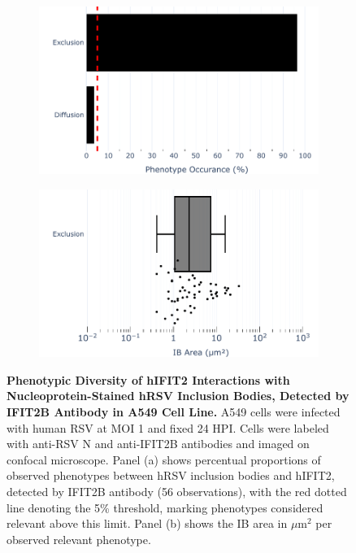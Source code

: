 \begin{figure}
    \begin{subfigure}{0.495\textwidth}
        \caption{}
        \includegraphics[width=1\linewidth]{08. Chapter 3/Figs/02. Infection/02. IFIT2/02. IFIT2B/01. bar_i2b_a549-n.pdf}
    \end{subfigure}
    \begin{subfigure}{0.495\textwidth}
        \caption{}
        \includegraphics[width=1\linewidth]{08. Chapter 3/Figs/02. Infection/02. IFIT2/02. IFIT2B/02. box_i2b_a549-n.pdf}
    \end{subfigure}
    \caption[Phenotypic Diversity of hIFIT2 Interactions with Nucleoprotein-Stained hRSV Inclusion Bodies, Detected by IFIT2B Antibody in A549 Cell Line.]{\textbf{Phenotypic Diversity of hIFIT2 Interactions with Nucleoprotein-Stained hRSV Inclusion Bodies, Detected by IFIT2B Antibody in A549 Cell Line.} A549 cells were infected with human RSV at MOI 1 and fixed 24 HPI. Cells were labeled with anti-RSV N and anti-IFIT2B antibodies and imaged on confocal microscope. Panel (a) shows percentual proportions of observed phenotypes between hRSV inclusion bodies and hIFIT2, detected by IFIT2B antibody (56 observations), with the red dotted line denoting the 5\% threshold, marking phenotypes considered relevant above this limit. Panel (b) shows the IB area in \(\mu \mbox{m}^2\) per observed relevant phenotype.}
    \label{fig:Phenotypic Diversity of hIFIT2 Interactions with Nucleoprotein-Stained hRSV Inclusion Bodies, Detected by IFIT2B Antibody in A549 Cell Line}
\end{figure}

